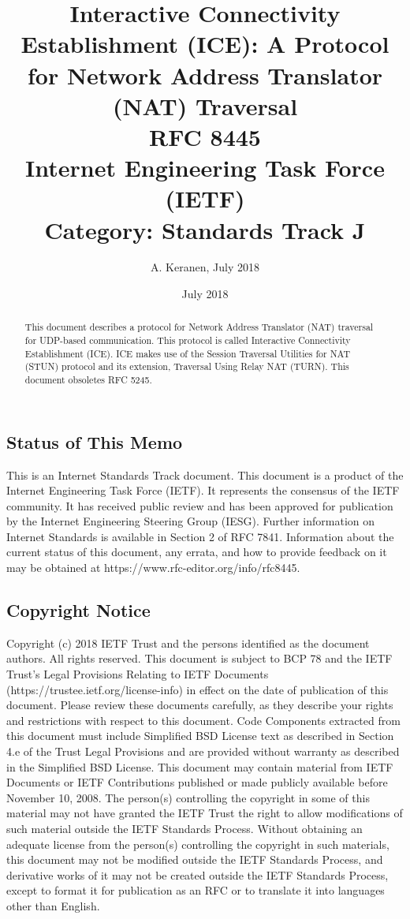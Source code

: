 \documentclass{article}
\title{Interactive Connectivity Establishment (ICE): A Protocol for Network Address Translator (NAT) Traversal\\[1em]
\large RFC 8445\\
Internet Engineering Task Force (IETF)\\
Category: Standards Track                                   J}
\author{A. Keranen, July 2018}
\date{July 2018}
\begin{document}
\maketitle

\begin{abstract}
This document describes a protocol for Network Address Translator (NAT) traversal for UDP-based communication.  This protocol is called Interactive Connectivity Establishment (ICE).  ICE makes use of the Session Traversal Utilities for NAT (STUN) protocol and its extension, Traversal Using Relay NAT (TURN). This document obsoletes RFC 5245.
\end{abstract}

\subsection*{Status of This Memo}
This is an Internet Standards Track document. This document is a product of the Internet Engineering Task Force (IETF).  It represents the consensus of the IETF community.  It has received public review and has been approved for publication by the Internet Engineering Steering Group (IESG).  Further information on Internet Standards is available in Section 2 of RFC 7841. Information about the current status of this document, any errata, and how to provide feedback on it may be obtained at https://www.rfc-editor.org/info/rfc8445.

\subsection*{Copyright Notice}
Copyright (c) 2018 IETF Trust and the persons identified as the document authors.  All rights reserved. This document is subject to BCP 78 and the IETF Trust's Legal Provisions Relating to IETF Documents (https://trustee.ietf.org/license-info) in effect on the date of publication of this document.  Please review these documents carefully, as they describe your rights and restrictions with respect to this document.  Code Components extracted from this document must include Simplified BSD License text as described in Section 4.e of the Trust Legal Provisions and are provided without warranty as described in the Simplified BSD License. This document may contain material from IETF Documents or IETF Contributions published or made publicly available before November 10, 2008.  The person(s) controlling the copyright in some of this material may not have granted the IETF Trust the right to allow modifications of such material outside the IETF Standards Process. Without obtaining an adequate license from the person(s) controlling the copyright in such materials, this document may not be modified outside the IETF Standards Process, and derivative works of it may not be created outside the IETF Standards Process, except to format it for publication as an RFC or to translate it into languages other than English.
\end{document}
